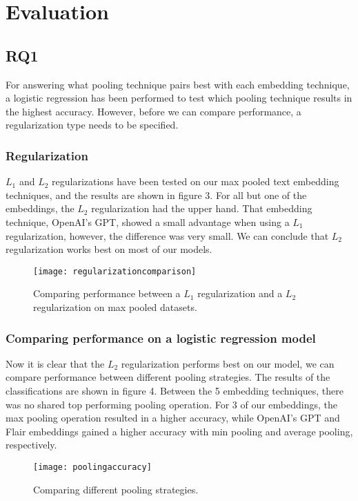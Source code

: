 \section{Evaluation}
\subsection{RQ1}
For answering what pooling technique pairs best with each embedding technique, a logistic regression has been performed to test which pooling technique results in the highest accuracy.
However, before we can compare performance, a regularization type needs to be specified. 

\subsubsection{Regularization}

$L_{1}$ and $L_{2}$ regularizations have been tested on our max pooled text embedding techniques, and the results are shown in figure 3.
For all but one of the embeddings, the $L_{2}$ regularization had the upper hand.
That embedding technique, OpenAI's GPT, showed a small advantage when using a $L_{1}$ regularization, however, the difference was very small.
We can conclude that $L_{2}$ regularization works best on most of our models.

\begin{figure}[h]
    \centering
    \texttt{[image: regularizationcomparison]}
    \caption{Comparing performance between a $L_{1}$ regularization and a $L_{2}$ regularization on max pooled datasets.}
\end{figure}

\subsubsection{Comparing performance on a logistic regression model}
Now it is clear that the $L_{2}$ regularization performs best on our model, we can compare performance between different pooling strategies.
The results of the classifications are shown in figure 4.
Between the 5 embedding techniques, there was no shared top performing pooling operation. 
For 3 of our embeddings, the max pooling operation resulted in a higher accuracy, while OpenAI's GPT and Flair embeddings gained a higher accuracy with min pooling and average pooling, respectively.

\begin{figure}[t]
    \centering
    \texttt{[image: poolingaccuracy]}
    \caption{Comparing different pooling strategies.}
\end{figure}

